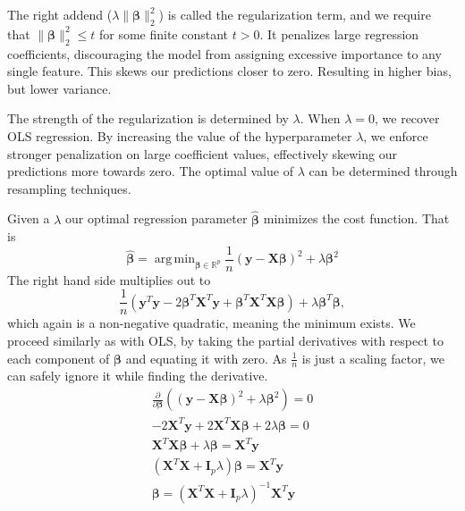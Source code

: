 \documentclass{article}
\DeclareMathOperator*{\argmin}{arg\,min}
\begin{document}
The right addend ($\lambda\lVert \boldsymbol{\beta} \rVert_2^2$) is called the regularization term, and we require that $\lVert \boldsymbol{\beta} \rVert_2^2 \leq t$ for some finite constant $t > 0$. It penalizes large regression coefficients, discouraging the model from assigning excessive importance to any single feature. This skews our predictions closer to zero. Resulting in higher bias, but lower variance.

The strength of the regularization is determined by $\lambda$. When $\lambda=0$, we recover OLS regression. By increasing the value of the hyperparameter $\lambda$, we enforce stronger penalization on large coefficient values, effectively skewing our predictions more towards zero. The optimal value of $\lambda$ can be determined through resampling techniques.

Given a $\lambda$ our optimal regression parameter $\boldsymbol{\hat{\beta}}$ minimizes the cost function. That is
\begin{equation*}
    \boldsymbol{\hat{\beta}} = \argmin_{\boldsymbol{\beta} \in \mathbb{R}^p} \frac{1}{n} \left( \boldsymbol{y} - \textbf{X} \boldsymbol{\beta} \right)^2 + \lambda \boldsymbol{\beta}^2
\end{equation*}
The right hand side multiplies out to
\begin{equation*}
    \frac{1}{n} \left( \boldsymbol{y}^T \boldsymbol{y} - 2 \boldsymbol{\beta}^T \textbf{X}^T \boldsymbol{y} + \boldsymbol{\beta}^T \textbf{X}^T \textbf{X} \boldsymbol{\beta} \right) + \lambda \boldsymbol{\beta}^T \boldsymbol{\beta},
\end{equation*}
which again is a non-negative quadratic, meaning the minimum exists. We proceed similarly as with OLS, by taking the partial derivatives with respect to each component of $\boldsymbol{\beta}$ and equating it with zero. As $\frac{1}{n}$ is just a scaling factor, we can safely ignore it while finding the derivative.
\begin{gather*}
    \frac{\partial}{\partial \boldsymbol{\beta}} \left( \left( \boldsymbol{y} - \textbf{X} \boldsymbol{\beta} \right)^2 + \lambda \boldsymbol{\beta}^2 \right) = 0 \\
    -2 \textbf{X}^T \boldsymbol{y} + 2 \textbf{X}^T \boldsymbol{X \beta} + 2\lambda \boldsymbol{\beta} = 0 \\
    \textbf{X}^T \boldsymbol{X \beta} + \lambda \boldsymbol{\beta} = \textbf{X}^T \boldsymbol{y} \\
    \left(\textbf{X}^T \textbf{X} + \boldsymbol{I}_p \lambda \right) \boldsymbol{\beta} = \textbf{X}^T \boldsymbol{y} \\
    \boldsymbol{\beta} = \left(\textbf{X}^T \textbf{X} + \boldsymbol{I}_p \lambda \right)^{-1} \textbf{X}^T \boldsymbol{y}
\end{gather*}
\end{document}
